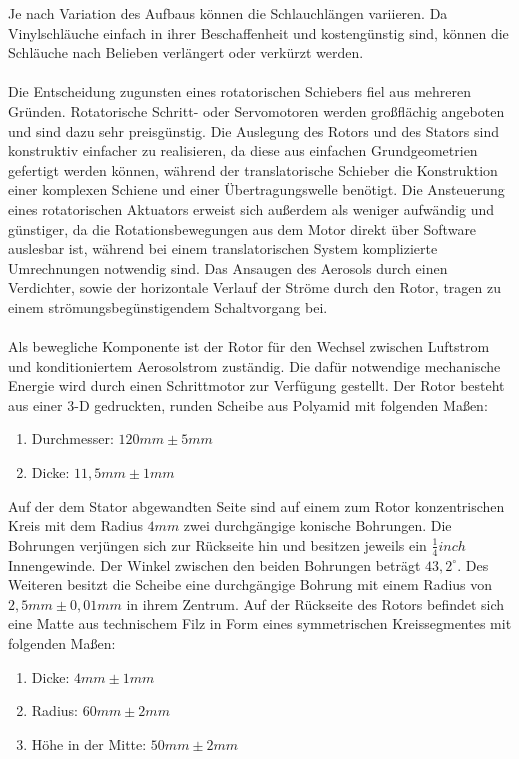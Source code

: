 Je nach Variation des Aufbaus k\"{o}nnen die Schlauchl\"{a}ngen variieren. Da Vinylschl\"{a}uche einfach in ihrer Beschaffenheit und kosteng\"{u}nstig sind, k\"{o}nnen die Schl\"{a}uche nach Belieben verl\"{a}ngert oder verk\"{u}rzt werden.
\\\\
Die Entscheidung zugunsten eines rotatorischen Schiebers fiel aus mehreren Gr\"{u}nden. Rotatorische Schritt- oder Servomotoren werden gro{\ss}fl\"{a}chig angeboten und sind dazu sehr preisg\"{u}nstig. Die Auslegung des Rotors und des Stators sind konstruktiv einfacher zu realisieren, da diese aus einfachen Grundgeometrien gefertigt werden k\"{o}nnen, w\"{a}hrend der translatorische Schieber die Konstruktion einer komplexen Schiene und einer \"{U}bertragungswelle ben\"{o}tigt. Die Ansteuerung eines rotatorischen Aktuators erweist sich au{\ss}erdem als weniger aufw\"{a}ndig und g\"{u}nstiger, da die Rotationsbewegungen aus dem Motor direkt \"{u}ber Software auslesbar ist, w\"{a}hrend bei einem translatorischen System komplizierte Umrechnungen notwendig sind. Das Ansaugen des Aerosols durch einen Verdichter, sowie der horizontale Verlauf der Str\"{o}me durch den Rotor, tragen zu einem str\"{o}mungsbeg\"{u}nstigendem Schaltvorgang bei.
\\\\
Als bewegliche Komponente ist der Rotor f\"{u}r den Wechsel zwischen Luftstrom und konditioniertem Aerosolstrom zust\"{a}ndig. Die daf\"{u}r notwendige mechanische Energie wird durch einen Schrittmotor zur Verf\"{u}gung gestellt. Der Rotor besteht aus einer 3-D gedruckten, runden Scheibe aus Polyamid mit folgenden Ma{\ss}en:
\begin{enumerate}
	\item Durchmesser: \(120 mm \pm 5 mm\)
	\item Dicke: \(11,5 mm \pm 1 mm\)
\end{enumerate}
Auf der dem Stator abgewandten Seite sind auf einem zum Rotor konzentrischen Kreis mit dem Radius \(4 mm\) zwei durchg\"{a}ngige konische Bohrungen. Die Bohrungen verj\"{u}ngen sich zur R\"{u}ckseite hin und besitzen jeweils ein \(\frac{1}{4} inch\) Innengewinde. Der Winkel zwischen den beiden Bohrungen betr\"{a}gt \(43,2^\circ\). Des Weiteren besitzt die Scheibe eine durchg\"{a}ngige Bohrung mit einem Radius von \(2,5 mm \pm 0,01 mm\) in ihrem Zentrum. Auf der R\"{u}ckseite des Rotors befindet sich eine Matte aus technischem Filz in Form eines symmetrischen Kreissegmentes mit folgenden Ma{\ss}en:
\begin{enumerate}
	\item Dicke: \(4 mm \pm 1mm\)
	\item Radius: \(60 mm \pm 2 mm\)
	\item H\"{o}he in der Mitte: \(50 mm \pm 2 mm\)
\end{enumerate}

